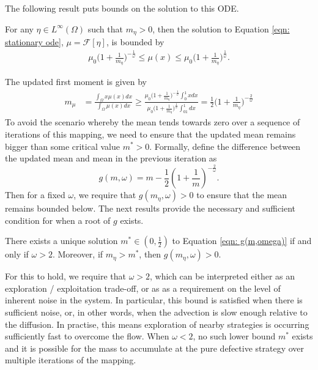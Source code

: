 \documentclass[10pt]{article}
\begin{document}
The following result puts bounds on the solution to this ODE.
\begin{lemma}\label{lemma: steady state, bounded solution}
    For any $\eta\in L^\infty(\Omega)$ such that $m_\eta > 0$, then the solution to Equation \eqref{eqn: stationary ode}, $\mu = \mathcal{F}[\eta]$, is bounded by
    \begin{align*}
        \mu_0 \bigg(1+\frac{1}{m_\eta}\bigg)^{-\frac{1}{\omega}} \leq \mu(x) \leq \mu_0\bigg(1+\frac{1}{m_\eta}\bigg)^{\frac{1}{\omega}}.
    \end{align*}
\end{lemma}
The updated first moment is given by
\begin{align*}
    m_\mu &= \frac{\int_{\Omega}x \mu(x) dx}{\int_{\Omega}\mu(x)dx}
\geq \frac{\mu_0\big(1+\frac{1}{m_\eta}\big)^{-\frac{1}{\omega}}\int^1_0x dx}{\mu_0\big(1+\frac{1}{m_\eta}\big)^{\frac{1}{\omega}}\int^1_01 dx}
    =\frac{1}{2}\bigg(1+\frac{1}{m_\eta}\bigg)^{-\frac{2}{\omega}}
\end{align*}
To avoid the scenario whereby the mean tends towards zero over a sequence of iterations of this mapping, we need to ensure that the updated mean remains bigger than some critical value $m^*>0$. Formally, define the difference between the updated mean and mean in the previous iteration as
\begin{equation}\label{eqn: g(m,omega)}
        g(m,\omega) = m - \frac{1}{2}(1+\frac{1}{m})^{-\frac{2}{\omega}}.
\end{equation}
Then for a fixed $\omega$, we require that $g(m_\eta,\omega) >0$ to ensure that the mean remains bounded below. The next results provide the necessary and sufficient condition for when a root of $g$ exists.
\begin{lemma}\label{lem: m^* unique}
    There exists a unique solution $m^* \in (0,\frac{1}{2})$ to Equation \eqref{eqn: g(m,omega)} if and only if $\omega > 2$. Moreover, if $m_\eta >m^*$, then $g(m_\eta,\omega)>0$.
\end{lemma}
For this to hold, we require that $\omega>2$, which can be interpreted either as an exploration / exploitation trade-off, or as as a requirement on the level of inherent noise in the system. In particular, this bound is satisfied when there is sufficient noise, or, in other words, when the advection is slow enough relative to the diffusion. In practise, this means exploration of nearby strategies is occurring sufficiently fast to overcome the flow. When $\omega < 2$, no such lower bound $m^*$ exists and it is possible for the mass to accumulate at the pure defective strategy over multiple iterations of the mapping.
\end{document}
